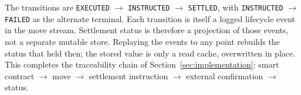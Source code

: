 \noindent The transitions are \texttt{EXECUTED} $\to$ \texttt{INSTRUCTED} $\to$ \texttt{SETTLED}, with \texttt{INSTRUCTED} $\to$ \texttt{FAILED} as the alternate terminal. Each transition is itself a logged lifecycle event in the move stream. Settlement status is therefore a projection of those events, not a separate mutable store. Replaying the events to any point rebuilds the status that held then; the stored value is only a read cache, overwritten in place. This completes the traceability chain of Section~\ref{sec:implementation}: smart contract $\to$ move $\to$ settlement instruction $\to$ external confirmation $\to$ status.


